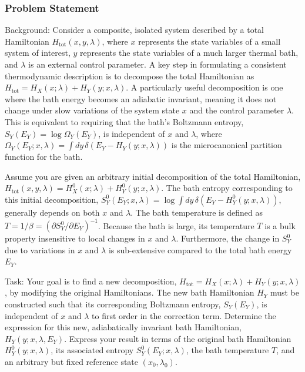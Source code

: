 \documentclass[10pt]{article}
\begin{document}
\subsubsection*{Problem Statement}
Background:
Consider a composite, isolated system described by a total Hamiltonian $H_{\text{tot}}(x, y, \lambda)$, where $x$ represents the state variables of a small system of interest, $y$ represents the state variables of a much larger thermal bath, and $\lambda$ is an external control parameter. A key step in formulating a consistent thermodynamic description is to decompose the total Hamiltonian as $H_{\text{tot}} = H_X(x; \lambda) + H_Y(y; x, \lambda)$. A particularly useful decomposition is one where the bath energy becomes an adiabatic invariant, meaning it does not change under slow variations of the system state $x$ and the control parameter $\lambda$. This is equivalent to requiring that the bath's Boltzmann entropy, $S_Y(E_Y) = \log \Omega_Y(E_Y)$, is independent of $x$ and $\lambda$, where $\Omega_Y(E_Y; x, \lambda) = \int dy\, \delta(E_Y - H_Y(y; x, \lambda))$ is the microcanonical partition function for the bath.

Assume you are given an arbitrary initial decomposition of the total Hamiltonian, $H_{\text{tot}}(x, y, \lambda) = H^0_X(x; \lambda) + H^0_Y(y; x, \lambda)$. The bath entropy corresponding to this initial decomposition, $S^0_Y(E_Y; x, \lambda) = \log \int dy\, \delta(E_Y - H^0_Y(y; x, \lambda))$, generally depends on both $x$ and $\lambda$. The bath temperature is defined as $T = 1/\beta = \left( \partial S^0_Y / \partial E_Y \right)^{-1}$. Because the bath is large, its temperature $T$ is a bulk property insensitive to local changes in $x$ and $\lambda$. Furthermore, the change in $S^0_Y$ due to variations in $x$ and $\lambda$ is sub-extensive compared to the total bath energy $E_Y$.

Task:
Your goal is to find a new decomposition, $H_{\text{tot}} = H_X(x; \lambda) + H_Y(y; x, \lambda)$, by modifying the original Hamiltonians. The new bath Hamiltonian $H_Y$ must be constructed such that its corresponding Boltzmann entropy, $S_Y(E_Y)$, is independent of $x$ and $\lambda$ to first order in the correction term. Determine the expression for this new, adiabatically invariant bath Hamiltonian, $H_Y(y; x, \lambda, E_Y)$. Express your result in terms of the original bath Hamiltonian $H^0_Y(y; x, \lambda)$, its associated entropy $S^0_Y(E_Y; x, \lambda)$, the bath temperature $T$, and an arbitrary but fixed reference state $(x_0, \lambda_0)$.
\end{document}

